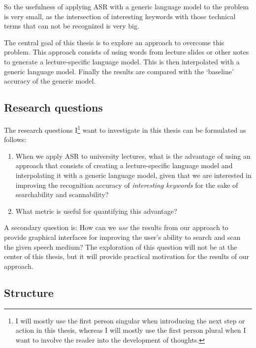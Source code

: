 \documentclass[]{article}
\begin{document}
So the usefulness of applying ASR with a generic language model to the
problem is very small, as the intersection of interesting keywords with
those technical terms that can not be recognized is very big.

The central goal of this thesis is to explore an approach to overcome
this problem. This approach consists of using words from lecture slides
or other notes to generate a lecture-specific language model. This is
then interpolated with a generic language model. Finally the results are
compared with the `baseline' accuracy of the generic model.

\subsection{Research questions}\label{research-questions}

The research questions I\footnote{I will mostly use the first person
  singular when introducing the next step or action in this thesis,
  whereas I will mostly use the first person plural when I want to
  involve the reader into the development of thoughts.} want to
investigate in this thesis can be formulated as follows:

\begin{enumerate}
\def\labelenumi{(\arabic{enumi})}
\item
  When we apply ASR to university lectures, what is the advantage of
  using an approach that consists of creating a lecture-specific
  language model and interpolating it with a generic language model,
  given that we are interested in improving the recognition accuracy of
  \emph{interesting keywords} for the sake of searchability and
  scannability?
\item
  What metric is useful for quantifying this advantage?
\end{enumerate}

A secondary question is: How can we \emph{use} the results from our
approach to provide graphical interfaces for improving the user's
ability to search and scan the given speech medium? The exploration of
this question will not be at the center of this thesis, but it will
provide practical motivation for the results of our approach.

\subsection{Structure}\label{structure}
\end{document}
